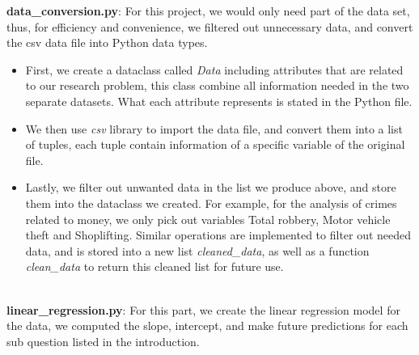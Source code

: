 \documentclass[fontsize=11pt]{article}
\begin{document}
\textbf{data\_conversion.py}: For this project, we would only need part of the data set, thus, for efficiency and convenience, we filtered out unnecessary data, and convert the csv data file into Python data types.
\begin{itemize}
    \item First, we create a dataclass called \textsl{Data} including attributes that are related to our research problem, this class combine all information needed in the two separate datasets. What each attribute represents is stated in the Python file.
    \item We then use \textsl{csv} library to import the data file, and convert them into a list of tuples, each tuple contain information of a specific variable of the original file.
    \item Lastly, we filter out unwanted data in the list we produce above, and store them into the dataclass we created. For example, for the analysis of crimes related to money, we only pick out variables Total robbery, Motor vehicle theft and Shoplifting. Similar operations are implemented to filter out needed data, and is stored into a new list \textit{cleaned\_data}, as well as a function \textit{clean\_data} to return this cleaned list for future use.
\end{itemize}
\\
\textbf{linear\_regression.py}: For this part, we create the linear regression model for the data, we computed the slope, intercept, and make future predictions for each sub question listed in the introduction.
\end{document}
